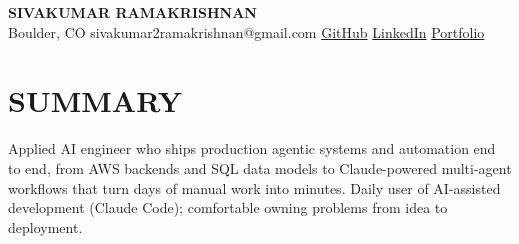 \documentclass[a4paper,11pt]{letter}
\newcommand{\sep}{\enspace\textbar\enspace}
\begin{document}
\thispagestyle{empty}

\begin{center}
    {\Large\textbf{SIVAKUMAR RAMAKRISHNAN}}\\[0.3em]
    Boulder, CO \sep sivakumar2ramakrishnan@gmail.com \sep
    \href{https://github.com/Arsive02}{\textcolor{secondary}{GitHub}} \sep
    \href{https://www.linkedin.com/in/siva-math/}{\textcolor{secondary}{LinkedIn}} \sep
    \href{https://sivakumar-portfolio-omega.vercel.app/}{\textcolor{secondary}{Portfolio}}
\end{center}
\vspace{-0.3em}

\section{SUMMARY}
Applied AI engineer who ships production agentic systems and automation end to end, from AWS backends and SQL data models to Claude-powered multi-agent workflows that turn days of manual work into minutes. Daily user of AI-assisted development (Claude Code); comfortable owning problems from idea to deployment.
\end{document}

